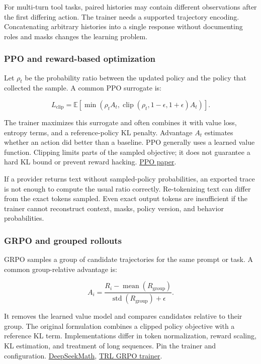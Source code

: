 \documentclass[
  11pt,
  letterpaper,
]{article}
\begin{document}
For multi-turn tool tasks, paired histories may contain different
observations after the first differing action. The trainer needs a
supported trajectory encoding. Concatenating arbitrary histories into a
single response without documenting roles and masks changes the learning
problem.

\subsubsection{PPO and reward-based
optimization}\label{ppo-and-reward-based-optimization}

Let \(\rho_t\) be the probability ratio between the updated policy and
the policy that collected the sample. A common PPO surrogate is:

\[L_{\mathrm{clip}}=\mathbb{E}\left[\min\left(\rho_t A_t,\operatorname{clip}(\rho_t,1-\epsilon,1+\epsilon)A_t\right)\right].\]

The trainer maximizes this surrogate and often combines it with value
loss, entropy terms, and a reference-policy KL penalty. Advantage
\(A_t\) estimates whether an action did better than a baseline. PPO
generally uses a learned value function. Clipping limits parts of the
sampled objective; it does not guarantee a hard KL bound or prevent
reward hacking. \href{https://arxiv.org/abs/1707.06347}{PPO paper}.

If a provider returns text without sampled-policy probabilities, an
exported trace is not enough to compute the usual ratio correctly.
Re-tokenizing text can differ from the exact tokens sampled. Even exact
output tokens are insufficient if the trainer cannot reconstruct
context, masks, policy version, and behavior probabilities.

\subsubsection{GRPO and grouped
rollouts}\label{grpo-and-grouped-rollouts}

GRPO samples a group of candidate trajectories for the same prompt or
task. A common group-relative advantage is:

\[A_i=\frac{R_i-\operatorname{mean}(R_{\mathrm{group}})}{\operatorname{std}(R_{\mathrm{group}})+\epsilon}.\]

It removes the learned value model and compares candidates relative to
their group. The original formulation combines a clipped policy
objective with a reference KL term. Implementations differ in token
normalization, reward scaling, KL estimation, and treatment of long
sequences. Pin the trainer and configuration.
\href{https://arxiv.org/abs/2402.03300}{DeepSeekMath},
\href{https://huggingface.co/docs/trl/main/en/grpo_trainer}{TRL GRPO
trainer}.
\end{document}
